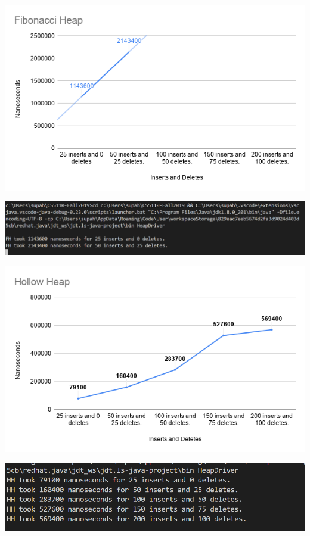 \documentclass[letter,10pt]{article}
\begin{document}
\begin{center}
	\includegraphics[scale=.5]{FibonacciHeap.png}\\
	
\end{center}
\begin{center}
	\includegraphics[scale=.35]{image(1).png}\\

\end{center}
\begin{center}
	\includegraphics[scale=.5]{HollowHeap.png}\\
	
\end{center}
\begin{center}
	\includegraphics[scale=.45]{image.png}\\
	
\end{center}
\end{document}
